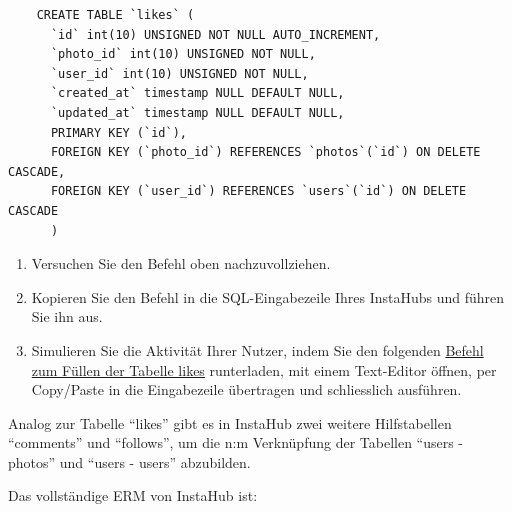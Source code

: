\begin{myexercise}
  \begin{lstlisting}
    CREATE TABLE `likes` (
      `id` int(10) UNSIGNED NOT NULL AUTO_INCREMENT,
      `photo_id` int(10) UNSIGNED NOT NULL,
      `user_id` int(10) UNSIGNED NOT NULL,
      `created_at` timestamp NULL DEFAULT NULL,
      `updated_at` timestamp NULL DEFAULT NULL,
      PRIMARY KEY (`id`),
      FOREIGN KEY (`photo_id`) REFERENCES `photos`(`id`) ON DELETE CASCADE,
      FOREIGN KEY (`user_id`) REFERENCES `users`(`id`) ON DELETE CASCADE
      )
  \end{lstlisting}
  \begin{enumerate}
    \item Versuchen Sie den Befehl oben nachzuvollziehen.
    \item Kopieren Sie den Befehl in die SQL-Eingabezeile Ihres InstaHubs und führen Sie ihn aus.
    \item Simulieren Sie die Aktivität Ihrer Nutzer, indem Sie den folgenden \href{https://wi-wissen.github.io/instahub-doc-de/sql/likes.sql}{Befehl zum Füllen der Tabelle likes} runterladen, mit einem Text-Editor öffnen, per Copy/Paste in die Eingabezeile übertragen und schliesslich ausführen.
  \end{enumerate}

\end{myexercise}

Analog zur Tabelle \enquote{likes} gibt es in InstaHub zwei weitere Hilfstabellen \enquote{comments} und \enquote{follows}, um die n:m Verknüpfung der Tabellen \enquote{users - photos} und \enquote{users - users} abzubilden.

Das vollständige \gls{ERM} von InstaHub ist:

